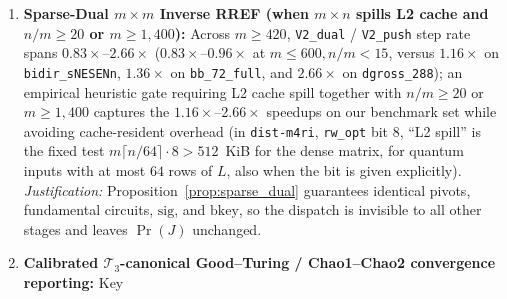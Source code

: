 \documentclass[12pt]{article}
\theoremstyle{definition}
\newcommand{\Tc}{\mathcal{T}_3}
\newcommand{\ttt}[1]{\texttt{#1}}
\begin{document}
\begin{enumerate}[label=\textbf{Stage~\arabic*.}, ref=\arabic*, wide=0pt]
    steps, against $9{,}092$ with the earlier $15\%$ per boundary slab and uniform starts otherwise; heights of $m/8$,
    $m/4$, or $3m/4$, or random heights did worse). Elsewhere the slabs found only the one-layer codewords (none of the
    $100$ of weight $7$ of \ttt{mitten\_150} at $T = 1$, whose runs with slabs only ended at weight $8$), hence the
    uniform steps in between (never slabs only); on the deep DEMs they were slower and covered less than the uniform
    steps and the index windows (earlier, on the window steps with Stage~\ref{stage:contract}, $0.43\times$ the
    minimum-weight codewords per second of the index windows on \ttt{shyps\_225} and $0.6\times$ on
    \ttt{gross\_144}). Slab steps re-find the same codewords over and over (a slab hit was worth $0.16$--$0.31$
    uniform draws on the $T = 1$ DEMs, and nothing once the layer was exhausted): counted in the vector statistic
    $\langle n \rangle$, their hits stopped \ttt{RW} with $41$--$86\%$ of the minimum-weight codewords found, and
    those of the index windows with $71$--$89\%$, against $99\%$ without them, so that the binary counts neither with
    a nonzero resolved \ttt{rw\_opt} (the canonical rule of Stage~\ref{stage:conv} counts uniform steps only); see bit
    4 below for the automatic mask.
  \item\label{stage:dual} \textbf{Sparse-Dual $m \times m$ Inverse RREF (when $m \times n$ spills L2 cache and $n/m
    \ge 20$ or $m \ge 1{,}400$):} Across $m \ge 420$, \ttt{V2\_dual} / \ttt{V2\_push} step rate spans
    $0.83\times$--$2.66\times$ ($0.83\times$--$0.96\times$ at $m \le 600, n/m < 15$, versus $1.16\times$ on
    \ttt{bidir\_sNESENn}, $1.36\times$ on \ttt{bb\_72\_full}, and $2.66\times$ on \ttt{dgross\_288}); an empirical
    heuristic gate requiring L2 cache spill together with $n/m \ge 20$ or $m \ge 1{,}400$ captures the
    $1.16\times$--$2.66\times$ speedups on our benchmark set while avoiding cache-resident overhead (in
    \ttt{dist-m4ri}, \ttt{rw\_opt} bit 8, ``L2 spill'' is the fixed test $m \lceil n/64 \rceil \cdot 8 > 512$~KiB for
    the dense matrix, for quantum inputs with at most $64$ rows of $L$, also when the bit is given explicitly).
    \emph{Justification:} Proposition~\ref{prop:sparse_dual} guarantees identical pivots, fundamental circuits,
    $\mathrm{sig}$, and $\mathrm{bkey}$, so the dispatch is invisible to all other stages and leaves $\Pr(J)$
    unchanged.
  \item\label{stage:conv} \textbf{Calibrated $\Tc$-canonical Good--Turing / Chao1--Chao2 convergence reporting:} Key

\end{enumerate}
\end{document}
